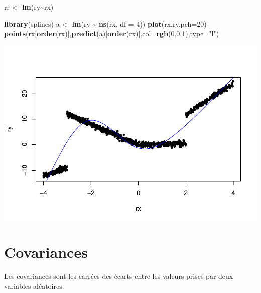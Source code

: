 \documentclass[
]{book}
\newenvironment{Shaded}{\begin{snugshade}}{\end{snugshade}}
\newcommand{\AttributeTok}[1]{\textcolor[rgb]{0.13,0.29,0.53}{#1}}
\newcommand{\DecValTok}[1]{\textcolor[rgb]{0.00,0.00,0.81}{#1}}
\newcommand{\FunctionTok}[1]{\textcolor[rgb]{0.13,0.29,0.53}{\textbf{#1}}}
\newcommand{\NormalTok}[1]{#1}
\newcommand{\OtherTok}[1]{\textcolor[rgb]{0.56,0.35,0.01}{#1}}
\newcommand{\SpecialCharTok}[1]{\textcolor[rgb]{0.81,0.36,0.00}{\textbf{#1}}}
\newcommand{\StringTok}[1]{\textcolor[rgb]{0.31,0.60,0.02}{#1}}
\begin{document}
\begin{Shaded}
\begin{Highlighting}[]
\NormalTok{rr }\OtherTok{\textless{}{-}} \FunctionTok{lm}\NormalTok{(ry}\SpecialCharTok{\textasciitilde{}}\NormalTok{rx)}
\end{Highlighting}
\end{Shaded}

\begin{Shaded}
\begin{Highlighting}[]
\FunctionTok{library}\NormalTok{(splines)}
\NormalTok{a }\OtherTok{\textless{}{-}} \FunctionTok{lm}\NormalTok{(ry }\SpecialCharTok{\textasciitilde{}} \FunctionTok{ns}\NormalTok{(rx, }\AttributeTok{df =} \DecValTok{4}\NormalTok{))}
\FunctionTok{plot}\NormalTok{(rx,ry,}\AttributeTok{pch=}\DecValTok{20}\NormalTok{)}
\FunctionTok{points}\NormalTok{(rx[}\FunctionTok{order}\NormalTok{(rx)],}\FunctionTok{predict}\NormalTok{(a)[}\FunctionTok{order}\NormalTok{(rx)],}\AttributeTok{col=}\FunctionTok{rgb}\NormalTok{(}\DecValTok{0}\NormalTok{,}\DecValTok{0}\NormalTok{,}\DecValTok{1}\NormalTok{),}\AttributeTok{type=}\StringTok{"l"}\NormalTok{)}
\end{Highlighting}
\end{Shaded}

\includegraphics{_main_files/figure-latex/unnamed-chunk-26-1.pdf}

\hypertarget{covariances}{%
\section{Covariances}\label{covariances}}

Les covariances sont les carrées des écarts entre les valeurs prises par deux
variables aléatoires.
\end{document}
